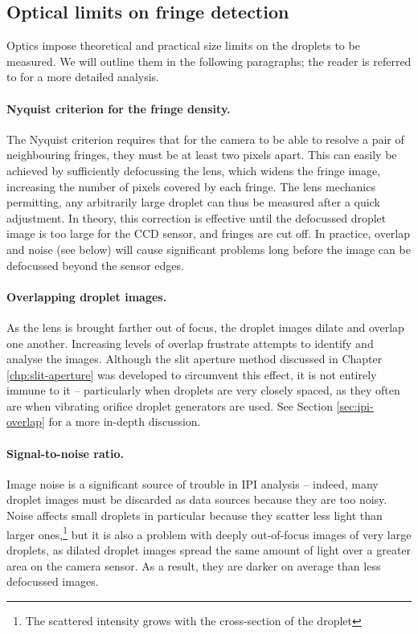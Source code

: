 \documentclass[10pt]{book}
\begin{document}
\subsection{Optical limits on fringe detection}
\label{sec:ipi-fringelimits}
Optics impose theoretical and practical size limits on the droplets to be
measured. We will outline them in the following paragraphs; the reader is
referred to \citet{Damaschke02} for a more detailed analysis.

\paragraph{Nyquist criterion for the fringe density.}
The Nyquist criterion requires that for the camera to be able to resolve a pair
of neighbouring fringes, they must be at least two pixels apart. This can easily
be achieved by sufficiently defocussing the lens, which widens the fringe image,
increasing the number of pixels covered by each fringe. The lens mechanics
permitting, any arbitrarily large droplet can thus be measured after a quick
adjustment. In theory, this correction is effective until the defocussed droplet
image is too large for the CCD sensor, and fringes are cut off. In practice,
overlap and noise (see below) will cause significant problems long before the
image can be defocussed beyond the sensor edges.

\paragraph{Overlapping droplet images.}
As the lens is brought farther out of focus, the droplet images dilate and
overlap one another. Increasing levels of overlap frustrate attempts to identify
and analyse the images. Although the slit aperture method discussed in Chapter
\ref{chp:slit-aperture} was developed to circumvent this effect, it is not
entirely immune to it -- particularly when droplets are very closely spaced, as
they often are when vibrating orifice droplet generators are used. See Section
\ref{sec:ipi-overlap} for a more in-depth discussion.

\paragraph{Signal-to-noise ratio.}
Image noise is a significant source of trouble in IPI analysis -- indeed, many
droplet images must be discarded as data sources because they are too noisy.
Noise affects small droplets in particular because they scatter less light than
larger ones,\footnote{The scattered intensity grows with the cross-section of
the droplet} but it is also a problem with deeply out-of-focus images of very
large droplets, as dilated droplet images spread the same amount of light over a
greater area on the camera sensor. As a result, they are darker on average than
less defocussed images. 
\end{document}
